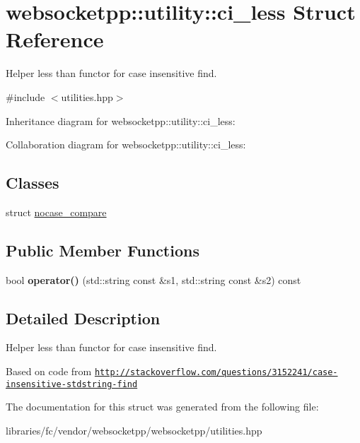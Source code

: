 \hypertarget{structwebsocketpp_1_1utility_1_1ci__less}{}\section{websocketpp\+:\+:utility\+:\+:ci\+\_\+less Struct Reference}
\label{structwebsocketpp_1_1utility_1_1ci__less}


Helper less than functor for case insensitive find.  




{\ttfamily \#include $<$utilities.\+hpp$>$}



Inheritance diagram for websocketpp\+:\+:utility\+:\+:ci\+\_\+less\+:


Collaboration diagram for websocketpp\+:\+:utility\+:\+:ci\+\_\+less\+:
\subsection*{Classes}
\begin{DoxyCompactItemize}
\item 
struct \mbox{\hyperlink{structwebsocketpp_1_1utility_1_1ci__less_1_1nocase__compare}{nocase\+\_\+compare}}
\end{DoxyCompactItemize}
\subsection*{Public Member Functions}
\begin{DoxyCompactItemize}
\item 
\mbox{\label{structwebsocketpp_1_1utility_1_1ci__less_a6b5354059eb2da0ecb7eb11afa6d8b54}} 
bool {\bfseries operator()} (std\+::string const \&s1, std\+::string const \&s2) const
\end{DoxyCompactItemize}


\subsection{Detailed Description}
Helper less than functor for case insensitive find. 

Based on code from \href{http://stackoverflow.com/questions/3152241/case-insensitive-stdstring-find}{\tt http\+://stackoverflow.\+com/questions/3152241/case-\/insensitive-\/stdstring-\/find} 

The documentation for this struct was generated from the following file\+:\begin{DoxyCompactItemize}
\item 
libraries/fc/vendor/websocketpp/websocketpp/utilities.\+hpp\end{DoxyCompactItemize}
